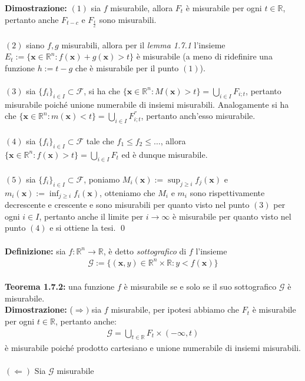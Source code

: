 \documentclass{article}
\numberwithin{equation}{subsection}
\begin{document}
\textbf{Dimostrazione:} $(1)$ sia $f$ misurabile, allora $F_t$ è misurabile per ogni $t \in \mathbb{R}$, pertanto anche $F_{t - c}$ e $F_{\frac{t}{c}}$ sono misurabili. \\ \\
$(2)$ siano $f, g$ misurabili, allora per il \textit{lemma 1.7.1} l'insieme \\ $E_t := \{ \mathbf{x} \in \mathbb{R}^n : f(\mathbf{x}) + g(\mathbf{x}) > t \}$ è misurabile (a meno di ridefinire una funzione $h := t - g$ che è misurabile per il punto $(1)$). \\ \\
$(3)$ sia $\{ f_i \}_{i \in I} \subset \mathcal{F}$, si ha che $\{ \mathbf{x} \in \mathbb{R}^n : M(\mathbf{x}) > t \} = \bigcup_{i \in I} F_{i;t}$, pertanto misurabile poiché unione numerabile di insiemi misurabili. Analogamente si ha che $\{ \mathbf{x} \in \mathbb{R}^n : m(\mathbf{x}) < t \} = \bigcup_{i \in I} F_{i;t}^{''}$, pertanto anch'esso misurabile. \\ \\
$(4)$ sia $\{ f_i \}_{i \in I} \subset \mathcal{F}$ tale che $f_1 \leq f_2 \leq \dots$, allora $\{ \mathbf{x} \in \mathbb{R}^n : f(\mathbf{x}) > t \} = \bigcup_{i \in I} F_t$ ed è dunque misurabile. \\ \\
$(5)$ sia $\{ f_i \}_{i \in I} \subset \mathcal{F}$, poniamo $M_i(\mathbf{x}) := \sup_{j \geq i} f_j(\mathbf{x})$ e $m_i(\mathbf{x}) := \inf_{j \geq i} f_i(\mathbf{x})$, otteniamo che $M_i$ e $m_i$ sono rispettivamente decrescente e crescente e sono misurabili per quanto visto nel punto $(3)$ per ogni $i \in I$, pertanto anche il limite per $i \rightarrow \infty$ è misurabile per quanto visto nel punto $(4)$ e si ottiene la tesi. \qed \\ \\
\textbf{Definizione:} sia $f : \mathbb{R}^n \longrightarrow \mathbb{R}$, è detto \textit{sottografico} di $f$ l'insieme
\begin{gather*}
    \mathcal{G} := \{ (\mathbf{x}, y) \in \mathbb{R}^n \times \mathbb{R} : y < f(\mathbf{x}) \} 
\end{gather*} \\
\textbf{Teorema 1.7.2:} una funzione $f$ è misurabile se e solo se il suo sottografico $\mathcal{G}$ è misurabile. \\

\textbf{Dimostrazione:} ($\Rightarrow)$ sia $f$ misurabile, per ipotesi abbiamo che $F_t$ è misurabile per ogni $t \in \mathbb{R}$, pertanto anche:
\begin{gather*}
    \mathcal{G} = \bigcup_{t \in \mathbb{R}} F_t \times (-\infty, t) 
\end{gather*}
è misurabile poiché prodotto cartesiano e unione numerabile di insiemi misurabili. \\ \\
$(\Leftarrow)$ Sia $\mathcal{G}$ misurabile
\end{document}
